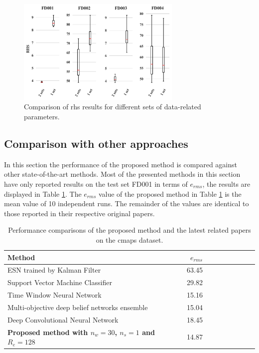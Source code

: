 \begin{figure}[!htb]
\centering
\includegraphics[width=0.7\textwidth]{img/rhs_comparisson.png}
\caption{Comparison of \gls{rhs} results for different sets of data-related parameters.}
\label{fig:scores_rhs}
\end{figure}

\subsection{Comparison with other approaches}

In this section the performance of the proposed method is compared against other state-of-the-art methods. Most of the presented methods in this section have only reported results on the test set FD001 in terms of $e_{rms}$, the results are displayed in Table \ref{table:results_comparison}. The $e_{rms}$ value of the proposed method in Table \ref{table:results_comparison} is the mean value of 10 independent runs. The remainder of the values are identical to those reported in their respective original papers.

\begin{table}[!htb]
\centering
\begin{tabular}{l | r r r r | r r r r}
	\hline	
	Method & $e_{rms}$ \\
  	\hline
  	ESN trained by Kalman Filter \cite{Peng2012} & 63.45\\
  	Support Vector Machine Classifier \cite{Louen2013} & 29.82\\
  	Time Window Neural Network \cite{Lim2016} & 15.16\\
  	Multi-objective deep belief networks ensemble \cite{Zhang2016} & 15.04\\
  	Deep Convolutional Neural Network \cite{Babu2016} & 18.45\\
  	\textbf{Proposed method with $n_w = 30$, $n_s=1$ and $R_e = 128$} & 14.87\\
  	\hline
\end{tabular}
\caption{Performance comparisons of the proposed method and the latest related papers on the \gls{cmaps} dataset.}
\label{table:results_comparison}
\end{table}

